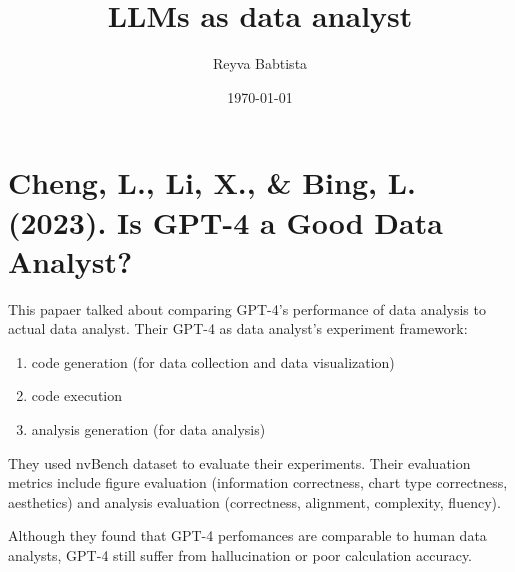 \documentclass[11pt]{article}
\author{Reyva Babtista}
\date{\today}
\title{LLMs as data analyst}
\begin{document}
\maketitle
\tableofcontents


\section{Cheng, L., Li, X., \& Bing, L. (2023). Is GPT-4 a Good Data Analyst? \cite{chengGPT4GoodData2023}}
\label{sec:org7dcba34}
This papaer talked about comparing GPT-4's
performance of data analysis to actual data analyst. Their GPT-4 as data
analyst's experiment framework:
\begin{enumerate}
\item code generation (for data collection and data visualization)
\item code execution
\item analysis generation (for data analysis)
\end{enumerate}
They used nvBench dataset to evaluate their experiments. Their evaluation
metrics include figure evaluation (information correctness, chart type
correctness, aesthetics) and analysis evaluation (correctness, alignment,
complexity, fluency).

Although they found that GPT-4 perfomances are comparable to human data
analysts, GPT-4 still suffer from hallucination or poor calculation accuracy.
\end{document}
